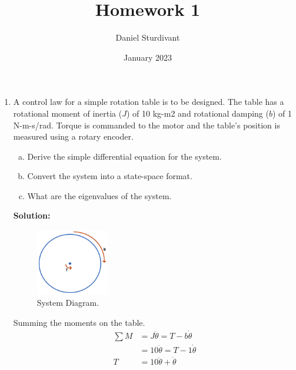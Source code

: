\documentclass[11pt]{article}
\author{Daniel Sturdivant}
\title{Homework 1}
\date{January 2023}
\newcommand{\solution}{\textbf{Solution: \\}}
\begin{document}
\maketitle
\thispagestyle{fancy}
\setlength{\parindent}{0pt}

\begin{enumerate}[label=\textbf{\arabic*.}]
  \itemsep 12pt
  \item A control law for a simple rotation table is to be designed. The table 
  has a rotational moment of inertia ($J$) of 10 kg-m2 and rotational damping 
  ($b$) of 1 N-m-s/rad. Torque is commanded to the motor and the table’s position 
  is measured using a rotary encoder.
  \begin{enumerate}[(a)]
    \itemsep -6pt
    \item Derive the simple differential equation for the system.
    \item Convert the system into a state-space format.
    \item What are the eigenvalues of the system.
  \end{enumerate}
  \solution
  \begin{figure}[H]
    \centering
    \includegraphics[width=0.3\textwidth]{p1.png}
    \caption{System Diagram.}
  \end{figure}

  Summing the moments on the table.
  \begin{equation}
    \begin{split}
      \sum M &= J \ddot{\theta} = T - b \dot{\theta} \\
      &= 10 \ddot{\theta} = T - 1 \dot{\theta} \\
      T &= 10 \ddot{\theta} + \dot{\theta}
    \end{split}
  \end{equation}


\end{enumerate}
\end{document}
